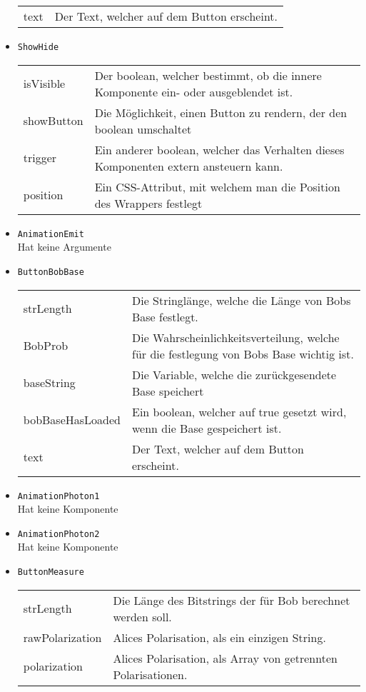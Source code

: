 \begin{itemize}
\begin{tabularx}{\textwidth}{p{4.5cm}p{9.5cm}}
text & Der Text, welcher auf dem Button erscheint.
\end{tabularx}
\item \texttt{ShowHide} \\
\begin{tabularx}{\textwidth}{p{4.5cm}p{9.5cm}} 
isVisible & Der boolean, welcher bestimmt, ob die innere Komponente ein- oder ausgeblendet ist. \\
showButton & Die Möglichkeit, einen Button zu rendern, der den boolean umschaltet \\
trigger & Ein anderer boolean, welcher das Verhalten dieses Komponenten extern ansteuern kann. \\
position & Ein CSS-Attribut, mit welchem man die Position des Wrappers festlegt 
\end{tabularx}
\item \texttt{AnimationEmit} \\
Hat keine Argumente
\item \texttt{ButtonBobBase} \\[3mm]
\begin{tabularx}{\textwidth}{p{4.5cm}p{9.5cm}} \\
strLength & Die Stringlänge, welche die Länge von Bobs Base festlegt. \\
BobProb & Die Wahrscheinlichkeitsverteilung, welche für die festlegung von Bobs Base wichtig ist. \\
baseString & Die Variable, welche die zurückgesendete Base speichert \\
bobBaseHasLoaded & Ein boolean, welcher auf true gesetzt wird, wenn die Base gespeichert ist. \\ 
text & Der Text, welcher auf dem Button erscheint.
\end{tabularx}
\item \texttt{AnimationPhoton1} \\
Hat keine Komponente
\item \texttt{AnimationPhoton2} \\
Hat keine Komponente
\item \texttt{ButtonMeasure} \\
\begin{tabularx}{\textwidth}{p{4.5cm}p{9.5cm}} \\
strLength & Die Länge des Bitstrings der für Bob berechnet werden soll. \\
rawPolarization & Alices Polarisation, als ein einzigen String. \\
polarization & Alices Polarisation, als Array von getrennten Polarisationen. \\

\end{tabularx}
\end{itemize}
